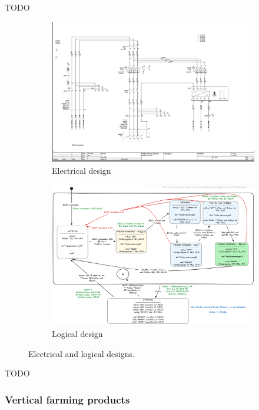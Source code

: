 \documentclass{PDS}
\begin{document}
TODO

\begin{figure}[htbp]
    \begin{subfigure}[b]{0.45\textwidth}
        \includegraphics[width=\textwidth]{./figures/paper_electric.png}
        \caption{Electrical design}
    \end{subfigure}
    \hfill
    \begin{subfigure}[b]{0.5\textwidth}
        \includegraphics[width=\textwidth]{./figures/paper_control.png}
        \caption{Logical design}
    \end{subfigure}
    \caption{Electrical and logical designs.}
\end{figure}

TODO

\subsubsection{Vertical farming products}
\label{sec:master-product-classical}
\end{document}
